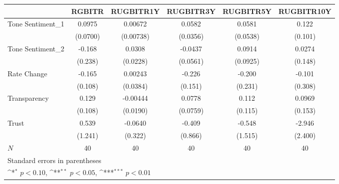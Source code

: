 {
\def\sym#1{\ifmmode^{#1}\else\(^{#1}\)\fi}
\begin{tabular}{l*{5}{c}}
\hline\hline
            &\multicolumn{1}{c}{RGBITR}&\multicolumn{1}{c}{RUGBITR1Y}&\multicolumn{1}{c}{RUGBITR3Y}&\multicolumn{1}{c}{RUGBITR5Y}&\multicolumn{1}{c}{RUGBITR10Y}\\
\hline
Tone Sentiment\_{1}&      0.0975         &     0.00672         &      0.0582         &      0.0581         &       0.122         \\
            &    (0.0700)         &   (0.00738)         &    (0.0356)         &    (0.0538)         &     (0.101)         \\
[1em]
Tone Sentiment\_{2}&      -0.168         &      0.0308         &     -0.0437         &      0.0914         &      0.0274         \\
            &     (0.238)         &    (0.0228)         &    (0.0561)         &    (0.0925)         &     (0.148)         \\
[1em]
Rate Change &      -0.165         &     0.00243         &      -0.226         &      -0.200         &      -0.101         \\
            &     (0.108)         &    (0.0384)         &     (0.151)         &     (0.231)         &     (0.308)         \\
[1em]
Transparency&       0.129         &    -0.00444         &      0.0778         &       0.112         &      0.0969         \\
            &     (0.108)         &    (0.0190)         &    (0.0759)         &     (0.115)         &     (0.153)         \\
[1em]
Trust       &       0.539         &     -0.0640         &      -0.409         &      -0.548         &      -2.946         \\
            &     (1.241)         &     (0.322)         &     (0.866)         &     (1.515)         &     (2.400)         \\
\hline
\(N\)       &          40         &          40         &          40         &          40         &          40         \\
\hline\hline
\multicolumn{6}{l}{\footnotesize Standard errors in parentheses}\\
\multicolumn{6}{l}{\footnotesize \sym{*} \(p<0.10\), \sym{**} \(p<0.05\), \sym{***} \(p<0.01\)}\\
\end{tabular}
}
